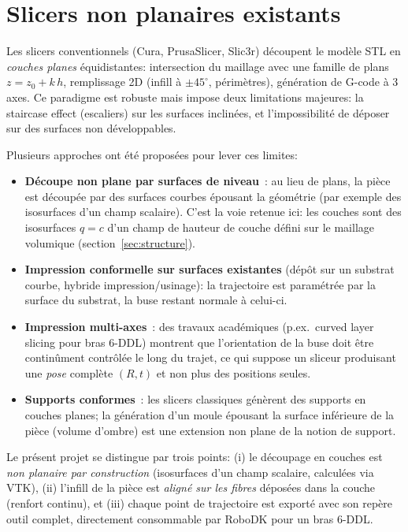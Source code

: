 \documentclass[11pt,a4paper]{article}
\begin{document}
\section{Slicers non planaires existants}\label{sec:related}

Les slicers conventionnels (Cura, PrusaSlicer, Slic3r) découpent le
modèle STL en \emph{couches planes} équidistantes: intersection du
maillage avec une famille de plans $z = z_0 + k\,h$, remplissage 2D
(infill à $\pm45^\circ$, périmètres), génération de G-code à 3 axes.
Ce paradigme est robuste mais impose deux limitations majeures: la
staircase effect (escaliers) sur les surfaces inclinées, et
l'impossibilité de déposer sur des surfaces non développables.

Plusieurs approches ont été proposées pour lever ces limites:
\begin{itemize}
  \item \textbf{Découpe non plane par surfaces de niveau}~: au lieu de
        plans, la pièce est découpée par des surfaces courbes épousant
        la géométrie (par exemple des isosurfaces d'un champ scalaire).
        C'est la voie retenue ici: les couches sont des isosurfaces
        $q = c$ d'un champ de \og hauteur de couche \fg{} défini sur le
        maillage volumique (section~\ref{sec:structure}).
  \item \textbf{Impression conformelle sur surfaces existantes}
        (dépôt sur un substrat courbe, hybride impression/usinage):
        la trajectoire est paramétrée par la surface du substrat, la
        buse restant normale à celui-ci.
  \item \textbf{Impression multi-axes}~: des travaux académiques
        (p.ex.\ curved layer slicing pour bras 6-DDL) montrent que
        l'orientation de la buse doit être continûment contrôlée le
        long du trajet, ce qui suppose un sliceur produisant une
        \emph{pose} complète $(R, t)$ et non plus des positions seules.
  \item \textbf{Supports conformes}~: les slicers classiques génèrent
        des supports en couches planes; la génération d'un moule
        épousant la surface inférieure de la pièce (volume d'ombre)
        est une extension non plane de la notion de support.
\end{itemize}

Le présent projet se distingue par trois points: (i) le découpage en
couches est \emph{non planaire par construction} (isosurfaces d'un
champ scalaire, calculées via VTK), (ii) l'infill de la pièce est
\emph{aligné sur les fibres} déposées dans la couche (renfort continu),
et (iii) chaque point de trajectoire est exporté avec son repère
outil complet, directement consommable par RoboDK pour un bras 6-DDL.
\end{document}
